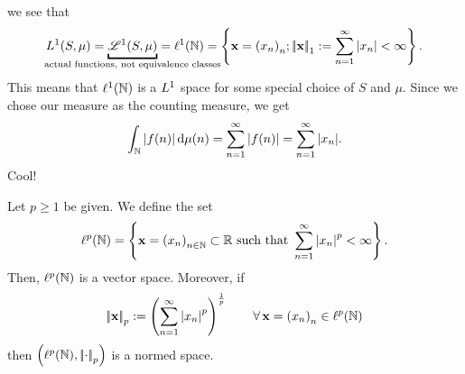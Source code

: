 \documentclass{article}
\begin{document}
we see that 
\begin{equation*}
	\Lone(S,\mu)=\underbracket{\mathscr{L}^1(S,\mu)}_{\mathclap{\text{actual functions, not equivalence classes}}}=\ell^1(\N)=\left\{\mathbf{x}={(x_{n})}_{n};\norm{\mathbf{x}}_{1}:=\sum_{n=1}^{\infty}|x_n|<\infty\right\}.
\end{equation*} 
This means that $\ell^1(\mathbb{N})$ is a $L^{1}$ space for some special choice of $S$ and $\mu$. Since we chose our measure as the counting measure, we get
\begin{equation*}
	\int_{\mathbb{N}}|f(n)|\mathop{}\!\mathrm{d}\mu(n)=\sum_{n=1}^\infty|f(n)|=\sum_{n=1}^\infty|x_n|.
\end{equation*}
Cool!
\begin{proposition}
	Let $p\geq1$ be given. We define the set
	\begin{equation*}
		\ell^p(\mathbb{N})=\left\{\mathbf{x}={(x_{n})}_{n\in\mathbb{N}}\subset\mathbb{R}\text{ such that }\sum_{n=1}^\infty\left|x_n\right|^{p}<\infty\right\}.
	\end{equation*}
	Then, $\ell^p(\mathbb{N})$ is a vector space. Moreover, if
	\begin{equation*}
		\left|\negthinspace\left|\mathbf{x}\right|\negthinspace\right|_{p}:=\left(\sum_{n=1}^\infty\left|x_n\right|^p\right)^{\frac{1}{p}}\qquad\forall\,\mathbf{x}={(x_{n})}_{n}\in\ell^p(\mathbb{N})
	\end{equation*}
	then $\left(\ell^p(\mathbb{N}),\left|\negthinspace\left|\cdot\right|\negthinspace\right|_p\right)$ is a normed space.
\end{proposition}
\end{document}
